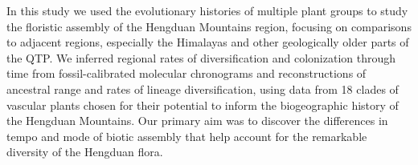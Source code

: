 


In this study we used the evolutionary histories of multiple plant
groups to study the floristic assembly of the Hengduan Mountains
region, focusing on comparisons to adjacent regions, especially the
Himalayas and other geologically older parts of the QTP. We inferred
regional rates of diversification and colonization through time from
fossil-calibrated molecular chronograms and reconstructions of
ancestral range and rates of lineage diversification, using data from
18 clades of vascular plants chosen for their potential to inform the
biogeographic history of the Hengduan Mountains. Our primary aim was
to discover the differences in tempo and mode of biotic assembly that
help account for the remarkable diversity of the Hengduan flora.


